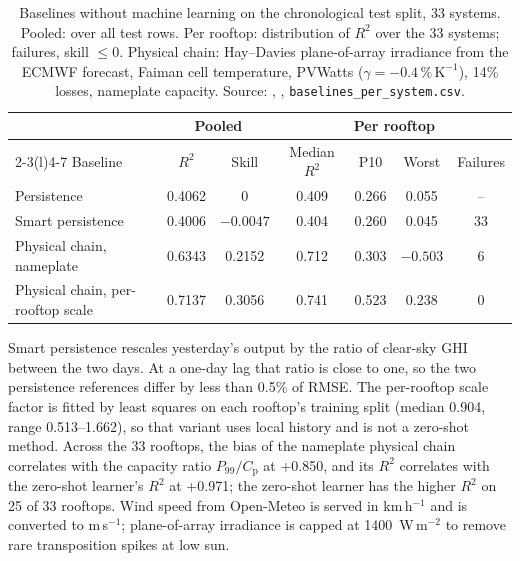 \begin{table}[H]
\centering
\caption{Baselines without machine learning on the chronological test split, 33 systems. Pooled: over all test rows. Per rooftop: distribution of $R^2$ over the 33 systems; failures, skill $\le 0$. Physical chain: Hay--Davies plane-of-array irradiance from the ECMWF forecast, Faiman cell temperature, PVWatts ($\gamma = -0.4\,\%\,\mathrm{K}^{-1}$), 14\% losses, nameplate capacity. Source: , , \texttt{baselines\_per\_system.csv}.}
\label{tab:s-baselines}
\small
\begin{tabularx}{\textwidth}{@{}X c c c c c c@{}}
\toprule
 & \multicolumn{2}{c}{Pooled} & \multicolumn{4}{c}{Per rooftop} \\
\cmidrule(lr){2-3}\cmidrule(l){4-7}
Baseline & $R^2$ & Skill & Median $R^2$ & P10 & Worst & Failures \\
\midrule
Persistence & 0.4062 & 0 & 0.409 & 0.266 & 0.055 & -- \\
Smart persistence & 0.4006 & $-0.0047$ & 0.404 & 0.260 & 0.045 & 33 \\
Physical chain, nameplate & 0.6343 & 0.2152 & 0.712 & 0.303 & $-0.503$ & 6 \\
Physical chain, per-rooftop scale & 0.7137 & 0.3056 & 0.741 & 0.523 & 0.238 & 0 \\
\bottomrule
\end{tabularx}
\end{table}

Smart persistence rescales yesterday's output by the ratio of clear-sky GHI between the two days. At a one-day lag that ratio is close to one, so the two persistence references differ by less than 0.5\% of RMSE. The per-rooftop scale factor is fitted by least squares on each rooftop's training split (median 0.904, range 0.513--1.662), so that variant uses local history and is not a zero-shot method. Across the 33 rooftops, the bias of the nameplate physical chain correlates with the capacity ratio $P_{99}/C_\mathrm{p}$ at +0.850, and its $R^2$ correlates with the zero-shot learner's $R^2$ at +0.971; the zero-shot learner has the higher $R^2$ on 25 of 33 rooftops. Wind speed from Open-Meteo is served in km\,h$^{-1}$ and is converted to m\,s$^{-1}$; plane-of-array irradiance is capped at 1400~W\,m$^{-2}$ to remove rare transposition spikes at low sun.

